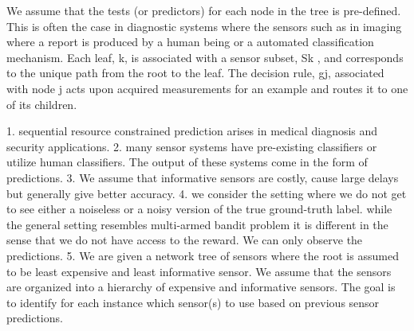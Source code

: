 \documentclass{article}
\begin{document}
We assume that the tests (or predictors) for each node in the tree is pre-defined. This is often the case in diagnostic systems where the sensors such as in imaging where a report is produced by a human being or a automated classification mechanism. Each leaf,
k, is associated with a sensor subset, Sk
, and corresponds to the unique path from the root to the leaf.
The decision rule, gj, associated with node
j acts upon acquired measurements for an
example and routes it to one of its children.


1. sequential resource constrained prediction arises in medical diagnosis and security applications.
2. many sensor systems have pre-existing classifiers or utilize human classifiers. The output of these systems come in the form of predictions.
3.  We assume that informative sensors are costly, cause large delays but generally give better accuracy. 
4. we consider the setting where we do not get to see either a noiseless or a noisy version of the true ground-truth label. while the general setting resembles multi-armed bandit problem it is different in the sense that we do not have access to the reward. We can only observe the predictions. 
5. We are given a network tree of sensors where the root is assumed to be least expensive and least informative sensor. We assume that the sensors are organized into a hierarchy of expensive and informative sensors. The goal is to identify for each instance which sensor(s) to use based on previous sensor predictions.


\end{document}
